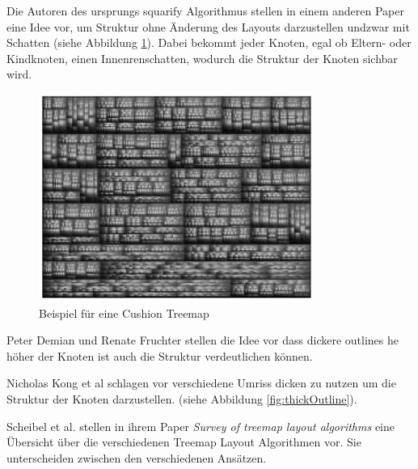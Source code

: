 Die Autoren des ursprungs squarify Algorithmus \cite{bruls2000squarified} stellen in einem anderen Paper \cite{cushionTreemaps} eine Idee vor, um Struktur ohne Änderung des Layouts darzustellen undzwar mit Schatten (siehe Abbildung \ref{fig:cushion}). Dabei bekommt jeder Knoten, egal ob Eltern- oder Kindknoten, einen Innenrenschatten, wodurch die Struktur der Knoten sichbar wird.

\begin{figure}
    \centering
    \includegraphics[width=0.8\textwidth]{images/cushionTreemap.png}
    \caption{Beispiel für eine Cushion Treemap \cite[4]{cushionTreemaps}}
    \label{fig:cushion}
\end{figure}

Peter Demian und Renate Fruchter stellen die Idee vor dass dickere outlines he höher der Knoten ist auch die Struktur verdeutlichen können. 

Nicholas Kong et al schlagen vor verschiedene Umriss dicken zu nutzen um die Struktur der Knoten darzustellen.\cite{2010-perception-treemaps} (siehe Abbildung \ref{fig:thickOutline}).


Scheibel et al. stellen in ihrem Paper \textit{Survey of treemap layout algorithms}\cite{scheibel2020survey} eine Übersicht über die verschiedenen Treemap Layout Algorithmen vor. Sie unterscheiden zwischen den verschiedenen Ansätzen. 

